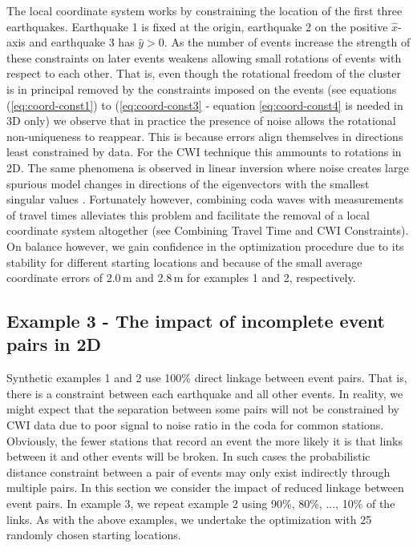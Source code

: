 \documentclass[12pt,double]{article}
\begin{document}
The local coordinate system works by constraining the location of
the first three earthquakes. Earthquake 1 is fixed at the origin,
earthquake 2 on the positive $\hat{x}$-axis and earthquake 3 has
$\hat{y}>0$. As the number of events increase the strength of these
constraints on later events weakens allowing small rotations of
events with respect to each other. That is, even though the
rotational freedom of the cluster is in principal removed by the
constraints imposed on the events (see equations
(\ref{eq:coord-const1}) to (\ref{eq:coord-const3} - equation
\ref{eq:coord-const4} is needed in 3D only) we observe that in
practice the presence of noise allows the rotational non-uniqueness
to reappear. This is because errors align themselves in directions
least constrained by data. For the CWI technique this ammounts to rotations in 2D.
The same phenomena is observed in linear inversion where noise
creates large spurious model changes in directions of the
eigenvectors with the smallest singular values \citep{dr_Aster05a}.
 Fortunately however, combining coda waves with
measurements of travel times alleviates this problem and facilitate
the removal of a local coordinate system altogether (see Combining Travel Time and 
CWI Constraints). On balance however, we gain
confidence in the optimization procedure due to its stability for
different starting locations and because of the small average
coordinate errors of 2.0\,m and 2.8\,m for examples 1 and 2,
respectively.

\subsection*{Example 3 - The impact of incomplete event pairs in 2D}

Synthetic examples 1 and 2 use 100\% direct linkage between event
pairs. That is, there is a constraint between each earthquake and
all other events. In reality, we might expect that the separation
between some pairs will not be constrained by CWI data due to poor
signal to noise ratio in the coda for common stations. Obviously,
the fewer stations that record an event the more likely it is that
links between it and other events will be broken. In such cases the
probabilistic distance constraint between a pair of events may only
exist indirectly through multiple pairs. In this section we consider
the impact of reduced linkage between event pairs. In example 3, we
repeat example 2 using 90\%, 80\%, ..., 10\% of the links. As with
the above examples, we undertake the optimization with 25 randomly
chosen starting locations.
\end{document}

